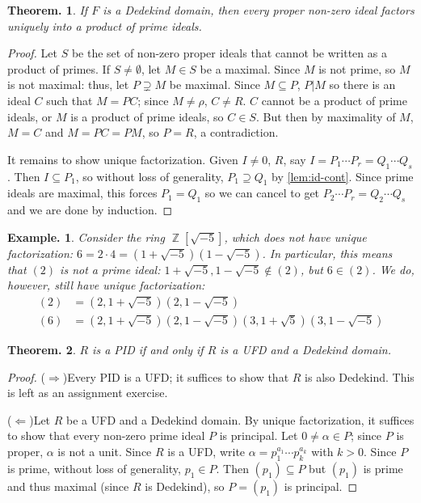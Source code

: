 \documentclass[11pt, a4paper]{memoir}
\DeclareMathOperator{\Z}{{\mathbb{Z}}}
\newcommand{\impr}{{($\Rightarrow$)\hspace{0.2cm}}}
\newcommand{\impl}{{($\Leftarrow$)\hspace{0.2cm}}}
\theoremstyle{change}
\newtheorem{theorem}{Theorem.}[section]
\theoremstyle{plain}
\theoremstyle{nonumberplain}
\newtheorem{example}{Example.}
\newtheorem{proof}{Proof}
\numberwithin{equation}{section}
\begin{document}
\begin{theorem}
    If $F$ is a Dedekind domain, then every proper non-zero ideal factors uniquely into a product of prime ideals.
\end{theorem}
\begin{proof}
    Let $S$ be the set of non-zero proper ideals that cannot be written as a product of primes.
    If $S\neq\emptyset$, let $M\in S$ be a maximal.
    Since $M$ is not prime, so $M$ is not maximal: thus, let $P\supsetneq M$ be maximal.
    Since $M\subseteq P$, $P|M$ so there is an ideal $C$ such that $M=PC$; since $M\neq\rho$, $C\neq R$.
    $C$ cannot be a product of prime ideals, or $M$ is a product of prime ideals, so $C\in S$.
    But then by maximality of $M$, $M=C$ and $M=PC=PM$, so $P=R$, a contradiction.

    It remains to show unique factorization.
    Given $I\neq 0$, $R$, say $I=P_1\cdots P_r=Q_1\cdots Q_s$.
    Then $I\subseteq P_1$, so without loss of generality, $P_1\supseteq Q_1$ by \cref{lem:id-cont}.
    Since prime ideals are maximal, this forces $P_1=Q_1$ so we can cancel to get $P_2\cdots P_r=Q_2\cdots Q_s$ and we are done by induction.
\end{proof}
\begin{example}
    Consider the ring $\Z[\sqrt{-5}]$, which does not have unique factorization: $6=2\cdot 4=(1+\sqrt{-5})(1-\sqrt{-5})$.
    In particular, this means that $(2)$ is not a prime ideal: $1+\sqrt{-5},1-\sqrt{-5}\notin(2)$, but $6\in(2)$.
    We do, however, still have unique factorization:
    \begin{align*}
        (2)&=(2,1+\sqrt{-5})(2,1-\sqrt{-5})\\
        (6)&=(2,1+\sqrt{-5})(2,1-\sqrt{-5})(3,1+\sqrt{5})(3,1-\sqrt{-5})
    \end{align*}
\end{example}
\begin{theorem}
    $R$ is a PID if and only if $R$ is a UFD and a Dedekind domain.
\end{theorem}
\begin{proof}
    \impr Every PID is a UFD; it suffices to show that $R$ is also Dedekind.
    This is left as an assignment exercise.

    \impl Let $R$ be a UFD and a Dedekind domain.
    By unique factorization, it suffices to show that every non-zero prime ideal $P$ is principal.
    Let $0\neq\alpha\in P$; since $P$ is proper, $\alpha$ is not a unit.
    Since $R$ is a UFD, write $\alpha=p_1^{a_1}\cdots p_k^{a_k}$ with $k>0$.
    Since $P$ is prime, without loss of generality, $p_1\in P$.
    Then $(p_1)\subseteq P$ but $(p_1)$ is prime and thus maximal (since $R$ is Dedekind), so $P=(p_1)$ is principal.
\end{proof}
\end{document}
